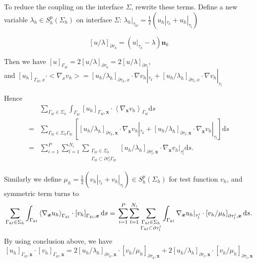 To reduce the coupling on the interface $\Sigma$, rewrite these terms. Define a new variable $\lambda_h\in S_h^p(\Sigma_h)$ on interface $\Sigma$: $\lambda_h|_{\tau_{kl}}=\frac{1}{2}(u_h|_{\tau_k}+u_h|_{\tau_l})$
\begin{definition}
    $$[u/\lambda]_{\partial \tau_k}=(u|_{\tau_k}-\lambda)\textbf{n}_k$$
\end{definition}

Then we have $[u]_{\Gamma_{kl}}=2[u/\lambda]_{\partial \tau_k}=2[u/\lambda]_{\partial \tau_l}$, \\
and $[u_h]_{\Gamma_{kl},x}\cdot <\nabla_x v_h>=[u_h/\lambda_h]_{\partial \tau_k,x}\cdot\nabla v_h|_{\tau_k}+[u_h/\lambda_h]_{\partial \tau_l,x}\cdot\nabla v_h|_{\tau_l}$

Hence 
$$\begin{aligned}
    &\sum_{\Gamma_{k l} \in \Sigma_{h}} \int_{\Gamma_{k l}}\left[u_{h}\right]_{\Gamma_{k l}, \boldsymbol{x}} \cdot\left\langle\nabla_{\boldsymbol{x}} v_{h}\right\rangle_{\Gamma_{k l}} \mathrm{d} s\\
    =&\sum_{\Gamma_{k l} \in \Sigma_{h} \Gamma_{k l}}\left[\left[u_{h} / \lambda_{h}\right]_{\partial \tau_{k}, \boldsymbol{x}} \cdot \nabla_{\boldsymbol{x}} v_{h }|_{\tau_{k}}+\left[u_{h} / \lambda_{h}\right]_{\partial \tau_{l}, \boldsymbol{x}} \cdot \nabla_{\boldsymbol{x}} v_{h }|_{\tau_{l}}\right] \mathrm{d} s \\
    =&\sum_{i=1}^{P} \sum_{l=1}^{N_{i}} \sum_{\substack{\Gamma_{k l} \in \Sigma_{h} \\\Gamma_{k l} \subset \partial \tau_{l}^{i} \Gamma_{k l}}}\left[u_{h} / \lambda_{h}\right]_{\partial \tau_{l}^{i}, \boldsymbol{x}} \cdot \nabla_{\boldsymbol{x}} v_{h }|_{\tau_{l}^{i}} \mathrm{d} s .
\end{aligned}$$

Similarly we define $\mu_h=\frac{1}{2}(v_h|_{\tau_k}+v_h|_{\tau_l})\in S_h^p(\Sigma_h)$ for test function $v_h$, and symmetric term turns to
$$\sum_{\Gamma_{k l} \in \Sigma_{h}} \int_{\Gamma_{k l}}\left\langle\nabla_{\boldsymbol{x}} u_{h}\right\rangle_{\Gamma_{k l}} \cdot\left[v_{h}\right]_{\Gamma_{k l}, \boldsymbol{x}} \mathrm{d} s= \\
    \sum_{i=1}^{P} \sum_{l=1}^{N_{i}} \sum_{\substack{\Gamma_{k l} \in \Sigma_{h} \\
    \Gamma_{k l} \subset \partial \tau_{l}^{i}}} \int_{\Gamma_{k l}} \nabla_{\boldsymbol{x}} u_{h }|_{\tau_{l}^{i}}\cdot\left[v_{h} / \mu_{h}\right]_{\partial \tau_{l}^{i}, \boldsymbol{x}} \mathrm{d} s . \\$$
By using conclusion above, we have 
$${\left[u_{h}\right]_{\Gamma_{k l}, \boldsymbol{x}} \cdot\left[v_{h}\right]_{\Gamma_{k l}, \boldsymbol{x}}}    
    =2\left[u_{h} / \lambda_{h}\right]_{\partial \tau_{k}, \boldsymbol{x}} \cdot\left[v_{h} / \mu_{h}\right]_{\partial \tau_{k}, \boldsymbol{x}}
    +2\left[u_{h} / \lambda_{h}\right]_{\partial \tau_{l}, \boldsymbol{x}} \cdot\left[v_{h} / \mu_{h}\right]_{\partial \tau_{l}, \boldsymbol{x}}$$    
    
